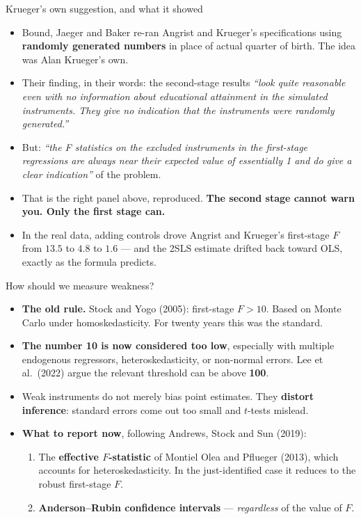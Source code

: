 \documentclass[
  11pt,
  ignorenonframetext,
  aspectratio=169,
]{beamer}
\providecommand{\tightlist}{%
  \setlength{\itemsep}{0pt}\setlength{\parskip}{0pt}}
\begin{document}
\begin{frame}{Krueger's own suggestion, and what it showed}
\protect{}\label{kruegers-own-suggestion-and-what-it-showed}
\begin{itemize}
\tightlist
\item
  Bound, Jaeger and Baker re-ran Angrist and Krueger's specifications
  using \textbf{randomly generated numbers} in place of actual quarter
  of birth. The idea was Alan Krueger's own.
\item
  Their finding, in their words: the second-stage results \emph{``look
  quite reasonable even with no information about educational attainment
  in the simulated instruments. They give no indication that the
  instruments were randomly generated.''}
\item
  But: \emph{``the F statistics on the excluded instruments in the
  first-stage regressions are always near their expected value of
  essentially 1 and do give a clear indication''} of the problem.
\item
  That is the right panel above, reproduced. \textbf{The second stage
  cannot warn you. Only the first stage can.}
\item
  In the real data, adding controls drove Angrist and Krueger's
  first-stage \(F\) from \(13.5\) to \(4.8\) to \(1.6\) --- and the 2SLS
  estimate drifted back toward OLS, exactly as the formula predicts.
\end{itemize}
\end{frame}

\begin{frame}{How should we measure weakness?}
\protect{}\label{how-should-we-measure-weakness}
\begin{itemize}
\tightlist
\item
  \textbf{The old rule.} Stock and Yogo (2005): first-stage \(F > 10\).
  Based on Monte Carlo under homoskedasticity. For twenty years this was
  the standard.
\item
  \textbf{The number 10 is now considered too low}, especially with
  multiple endogenous regressors, heteroskedasticity, or non-normal
  errors. Lee et al.~(2022) argue the relevant threshold can be above
  \textbf{100}.
\item
  Weak instruments do not merely bias point estimates. They
  \textbf{distort inference}: standard errors come out too small and
  \(t\)-tests mislead.
\item
  \textbf{What to report now}, following Andrews, Stock and Sun (2019):

  \begin{enumerate}
  \tightlist
  \item
    The \textbf{effective \(F\)-statistic} of Montiel Olea and Pflueger
    (2013), which accounts for heteroskedasticity. In the
    just-identified case it reduces to the robust first-stage \(F\).
  \item
    \textbf{Anderson--Rubin confidence intervals} --- \emph{regardless}
    of the value of \(F\).
  \end{enumerate}
\end{itemize}
\end{frame}
\end{document}
